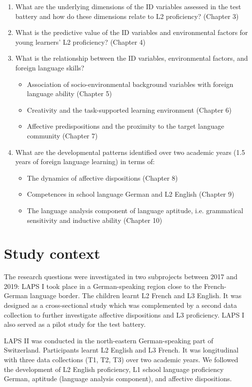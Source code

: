 \documentclass[output=paper]{langsci/langscibook}
\begin{document}
\begin{enumerate}
\item What are the underlying dimensions of the ID variables assessed in the test battery and how do these dimensions relate to L2 proficiency? (Chapter 3)
\item What is the predictive value of the ID variables and environmental factors for young learners’ L2 proficiency? (Chapter 4)
\item What is the relationship between the ID variables, environmental factors, and foreign language skills?
    \begin{itemize}
    \item Association of socio-environmental background variables with foreign language ability (Chapter 5)
    \item Creativity and the task-supported learning environment (Chapter 6)
    \item Affective predispositions and the proximity to the target language community (Chapter 7)
    \end{itemize}
\item What are the developmental patterns identified over two academic years (1.5 years of foreign language learning) in terms of:
    \begin{itemize}
    \item The dynamics of affective dispositions (Chapter 8)
    \item Competences in school language German and L2 English (Chapter 9)
    \item The language analysis component of language aptitude, i.e. grammatical sensitivity and inductive ability (Chapter 10)
    \end{itemize}
\end{enumerate}

\section{Study context} 

The research questions were investigated in two subprojects between 2017 and 2019:  LAPS I took place in a German-speaking region close to the French-German language border. The children learnt L2 French and L3 English. It was designed as a cross-sectional study which was complemented by a second data collection to further investigate affective dispositions and L3 proficiency.  LAPS I also served as a pilot study for the test battery. 

LAPS II was conducted in the north-eastern German-speaking part of Switzerland. Participants learnt L2 English and L3 French. It was longitudinal with three data collections (T1, T2, T3) over two academic years. We followed the development of L2 English proficiency, L1 school language proficiency German, aptitude (language analysis component), and affective dispositions. 
\end{document}

